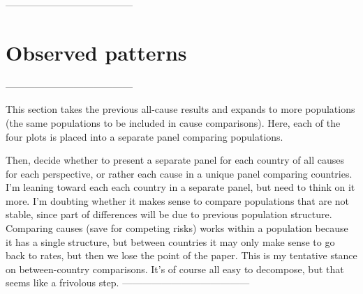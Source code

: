 \documentclass{article}
\begin{document}
---------------------------------------
\section{Observed patterns}
---------------------------------------

This section takes the previous all-cause results and expands to more
populations (the same populations to be included in cause comparisons). Here,
each of the four plots is placed into a separate panel comparing populations.

Then, decide whether to present a separate panel for each country of all causes
for each perspective, or rather each cause in a unique panel comparing
countries. I'm leaning toward each each country in a separate panel, but need to
think on it more. I'm doubting whether it makes sense to compare populations
that are not stable, since part of differences will be due to previous
population structure. Comparing causes (save for competing risks) works within a
population because it has a single structure, but between countries it may only
make sense to go back to rates, but then we lose the point of the paper. This is
my tentative stance on between-country comparisons. It's of course all easy to
decompose, but that seems like a frivolous step.
%
---------------------------------------

    
\end{document}
